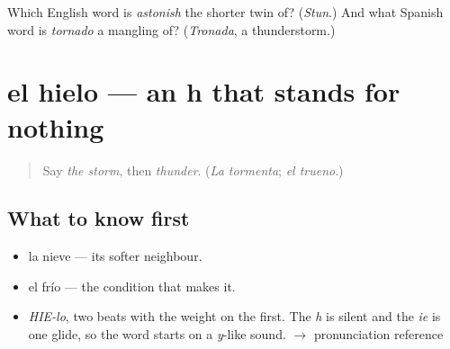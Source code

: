 \begin{tcolorbox}[breakable,colback=teal!4,colframe=teal!35!black,title={Before you move on}]
Which English word is \emph{astonish} the shorter twin of? (\emph{Stun}.) And what Spanish word is \emph{tornado} a mangling of? (\emph{Tronada}, a thunderstorm.)
\end{tcolorbox}
\section[el hielo]{el hielo — an h that stands for nothing}

\label{lesson:ES-C370-hielo}



\begin{quote}
Say \emph{the storm}, then \emph{thunder}. (\emph{La tormenta}; \emph{el trueno}.)
\end{quote}

\subsection*{What to know first}
\begin{itemize}
\raggedright
  \item la nieve — its softer neighbour.
  \item el frío — the condition that makes it.
\end{itemize}

\begin{sounds}
\begin{itemize}
\raggedright
  \item \emph{HIE-lo}, two beats with the weight on the first. The \emph{h} is silent and the \emph{ie} is one glide, so the word starts on a \emph{y}-like sound. $\to$ pronunciation reference
\end{itemize}
\end{sounds}

